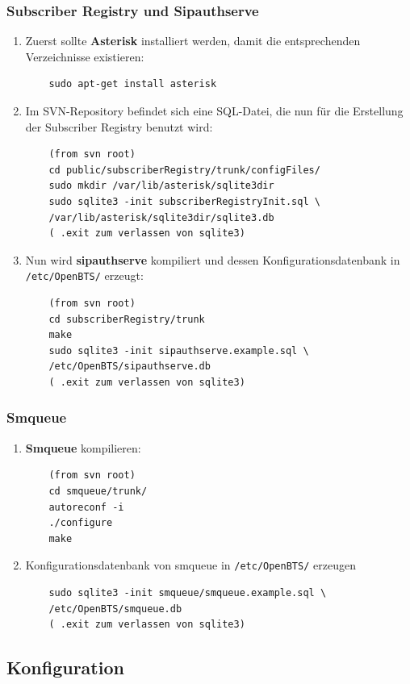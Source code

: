 \subsubsection{Subscriber Registry und Sipauthserve}
\begin{enumerate}
	\item Zuerst sollte \textbf{Asterisk} installiert werden, damit die entsprechenden Verzeichnisse existieren:
	\begin{verbatim}
	sudo apt-get install asterisk
	\end{verbatim}
	\item Im SVN-Repository befindet sich eine SQL-Datei, die nun für die Erstellung der Subscriber Registry benutzt wird:
	\begin{verbatim}
	(from svn root)
	cd public/subscriberRegistry/trunk/configFiles/
	sudo mkdir /var/lib/asterisk/sqlite3dir
	sudo sqlite3 -init subscriberRegistryInit.sql \
	/var/lib/asterisk/sqlite3dir/sqlite3.db
	( .exit zum verlassen von sqlite3)
	\end{verbatim}
	\item Nun wird \textbf{sipauthserve} kompiliert und dessen Konfigurationsdatenbank in \verb|/etc/OpenBTS/| erzeugt:
	\begin{verbatim}
	(from svn root)
	cd subscriberRegistry/trunk
	make
	sudo sqlite3 -init sipauthserve.example.sql \
	/etc/OpenBTS/sipauthserve.db
	( .exit zum verlassen von sqlite3)
	\end{verbatim}
\end{enumerate}

\subsubsection{Smqueue}
\begin{enumerate}
	\item \textbf{Smqueue} kompilieren:
	\begin{verbatim}
	(from svn root)
	cd smqueue/trunk/
	autoreconf -i
	./configure
	make
	\end{verbatim}
	\item Konfigurationsdatenbank von smqueue in \verb|/etc/OpenBTS/| erzeugen
	\begin{verbatim}
	sudo sqlite3 -init smqueue/smqueue.example.sql \
	/etc/OpenBTS/smqueue.db
	( .exit zum verlassen von sqlite3)
  \end{verbatim} 
\end{enumerate}

\subsection{Konfiguration}
\label{sec:Konfiguration}
